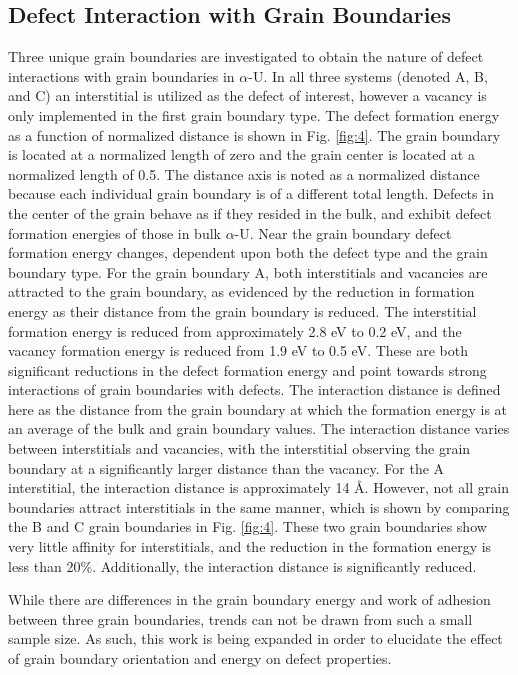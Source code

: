 \documentclass{anstrans}
\begin{document}
\subsection{Defect Interaction with Grain Boundaries}

Three unique grain boundaries are investigated to obtain the nature of defect interactions with grain boundaries in $\alpha$-U. In all three systems (denoted A, B, and C) an interstitial is utilized as the defect of interest, however a vacancy is only implemented in the first grain boundary type. The defect formation energy as a function of normalized distance is shown in Fig. \ref{fig:4}. The grain boundary is located at a normalized length of zero and the grain center is located at a normalized length of 0.5. The distance axis is noted as a normalized distance because each individual grain boundary is of a different total length. Defects in the center of the grain behave as if they resided in the bulk, and exhibit defect formation energies of those in bulk $\alpha$-U. Near the grain boundary defect formation energy changes, dependent upon both the defect type and the grain boundary type. For the grain boundary A, both interstitials and vacancies are attracted to the grain boundary, as evidenced by the reduction in formation energy as their distance from the grain boundary is reduced. The interstitial formation energy is reduced from approximately 2.8 eV to 0.2 eV, and the vacancy formation energy is reduced from 1.9 eV to 0.5 eV. These are both significant reductions in the defect formation energy and point towards strong interactions of grain boundaries with defects. The interaction distance is defined here as the distance from the grain boundary at which the formation energy is at an average of the bulk and grain boundary values. The interaction distance varies between interstitials and vacancies, with the interstitial observing the grain boundary at a significantly larger distance than the vacancy. For the A interstitial, the interaction distance is approximately 14 \AA. However, not all grain boundaries attract interstitials in the same manner, which is shown by comparing the B and C grain boundaries in Fig. \ref{fig:4}. These two grain boundaries show very little affinity for interstitials, and the reduction in the formation energy is less than 20\%. Additionally, the interaction distance is significantly reduced. 

While there are differences in the grain boundary energy and work of adhesion between three grain boundaries, trends can not be drawn from such a small sample size. As such, this work is being expanded in order to elucidate the effect of grain boundary orientation and energy on defect properties. 
\end{document}
